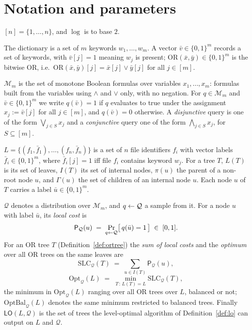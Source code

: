 \documentclass{aicr-conjecture}
\newcommand{\bits}{\{0,1\}}
\newcommand{\Qd}{\mathcal{Q}}
\newcommand{\Mon}{\mathcal{M}}
\newcommand{\ORv}{\mathrm{OR}}
\newcommand{\Pcost}{\mathsf{P}}
\newcommand{\SLC}{\mathrm{SLC}}
\newcommand{\Opt}{\mathrm{Opt}}
\newcommand{\OptBal}{\mathrm{OptBal}}
\newcommand{\LO}{\mathsf{LO}}
\begin{document}
\section{Notation and parameters}\label{sec:notation}

$[n] = \{1,\dots,n\}$, and $\log$ is to base $2$.

The dictionary is a set of $m$ keywords $w_1,\dots,w_m$. A vector
$\bar v \in \bits^m$ records a set of keywords, with $\bar v[j] = 1$
meaning $w_j$ is present; $\ORv(\bar x,\bar y) \in \bits^m$ is the bitwise
OR, i.e.\ $\ORv(\bar x,\bar y)[j] = \bar x[j] \vee \bar y[j]$ for all
$j \in [m]$.

$\Mon_m$ is the set of monotone Boolean formulas over variables
$x_1,\dots,x_m$: formulas built from the variables using $\wedge$ and
$\vee$ only, with no negation. For $q \in \Mon_m$ and
$\bar v \in \bits^m$ we write $q(\bar v) = 1$ if $q$ evaluates to true
under the assignment $x_j := \bar v[j]$ for all $j \in [m]$, and
$q(\bar v) = 0$ otherwise. A \emph{disjunctive} query is one of the form
$\bigvee_{j \in S} x_j$ and a \emph{conjunctive} query one of the form
$\bigwedge_{j \in S} x_j$, for $S \subseteq [m]$.

$L = \{(f_1,\bar f_1),\dots,(f_n,\bar f_n)\}$ is a set of $n$ file
identifiers $f_i$ with vector labels $\bar f_i \in \bits^m$, where
$\bar f_i[j] = 1$ iff file $f_i$ contains keyword $w_j$. For a tree $T$,
$L(T)$ is its set of leaves, $I(T)$ its set of internal nodes, $\pi(u)$ the
parent of a non-root node $u$, and $\Gamma(u)$ the set of children of an
internal node $u$. Each node $u$ of $T$ carries a label
$\bar u \in \bits^m$.

$\Qd$ denotes a distribution over $\Mon_m$, and $q \sample \Qd$ a sample
from it. For a node $u$ with label $\bar u$, its \emph{local cost} is
\[
  \Pcost_{\Qd}(u) \;=\; \Pr_{q \sample \Qd}\bigl[\,q(\bar u) = 1\,\bigr]
  \;\in\; [0,1].
\]
For an OR tree $T$ (Definition~\ref{def:ortree}) the \emph{sum of local
costs} and the \emph{optimum} over all OR trees on the same leaves are
\[
  \SLC_{\Qd}(T) \;=\; \sum_{u \in I(T)} \Pcost_{\Qd}(u),
\]
\[
  \Opt_{\Qd}(L) \;=\; \min_{T \,:\, L(T) = L} \SLC_{\Qd}(T),
\]
the minimum in $\Opt_{\Qd}(L)$ ranging over all OR trees over $L$, balanced
or not; $\OptBal_{\Qd}(L)$ denotes the same minimum restricted to balanced
trees. Finally $\LO(L,\Qd)$ is the set of trees the level-optimal algorithm
of Definition~\ref{def:lo} can output on $L$ and $\Qd$.
\end{document}
